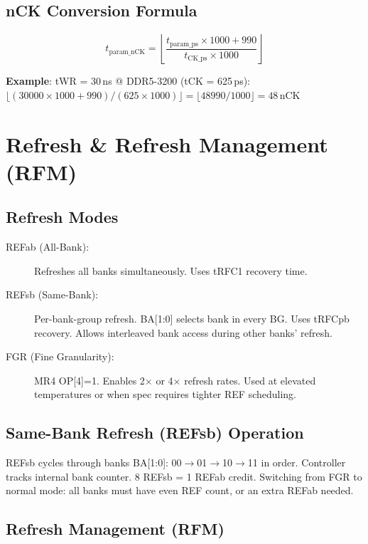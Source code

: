 \documentclass[10pt,a4paper,twoside]{article}
\begin{document}
\subsection{nCK Conversion Formula}

$$t_{\mathrm{param\_nCK}} = \left\lfloor \frac{t_{\mathrm{param\_ps}} \times 1000 + 990}{t_{\mathrm{CK\_ps}} \times 1000} \right\rfloor$$

\textbf{Example}: tWR = 30\,ns @ DDR5-3200 (tCK = 625\,ps):
$\lfloor (30000 \times 1000 + 990) / (625 \times 1000) \rfloor = \lfloor 48990/1000 \rfloor = 48$\,nCK

\section{Refresh \& Refresh Management (RFM)}

\subsection{Refresh Modes}

\begin{description}
  \item[REFab (All-Bank):] Refreshes all banks simultaneously. Uses tRFC1 recovery time.
  \item[REFsb (Same-Bank):] Per-bank-group refresh. BA[1:0] selects bank in every BG.
    Uses tRFCpb recovery. Allows interleaved bank access during other banks' refresh.
  \item[FGR (Fine Granularity):] MR4 OP[4]=1. Enables 2$\times$ or 4$\times$ refresh rates.
    Used at elevated temperatures or when spec requires tighter REF scheduling.
\end{description}

\subsection{Same-Bank Refresh (REFsb) Operation}

REFsb cycles through banks BA[1:0]: 00$\rightarrow$01$\rightarrow$10$\rightarrow$11 in order.
Controller tracks internal bank counter. 8 REFsb = 1 REFab credit.
Switching from FGR to normal mode: all banks must have even REF count, or an extra REFab needed.

\subsection{Refresh Management (RFM)}
\end{document}
